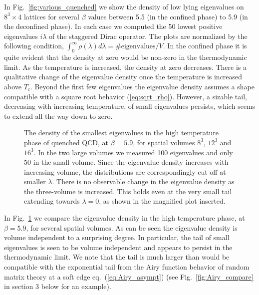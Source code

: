 \documentclass[11pt]{article}
\newcommand{\noi}{\vspace{12pt}\noindent}
\begin{document}
\noi 
In Fig.~\ref{fig:various_quenched} we show the density of low
lying eigenvalues on $8^3 \times 4$ lattices for several $\beta$
values between 5.5 (in the confined phase) to 5.9 (in the deconfined
phase).  In each case we computed the 50 lowest positive eigenvalues
$i\lambda$ of the staggered Dirac operator. The plots are normalized
by the following condition, $\int_0^{\infty}\rho(\lambda)d\lambda=\textrm{\#eigenvalues}/V$.
In the confined phase it is quite evident that the density at zero
would be non-zero in the thermodynamic limit. As the temperature is
increased, the density at zero decreases.
There is a qualitative change of the eigenvalue density once the
temperature is increased above $T_c$. Beyond the first few eigenvalues
the eigenvalue density assumes a shape compatible with a square root
behavior (\ref{eq:sqrt_rho}). However, a sizable tail, decreasing with
increasing temperature, of small eigenvalues persists, which seems to
extend all the way down to zero.

\begin{figure}
\begin{center}
\textwidth
{}
\end{center}
\vspace*{-2mm}
\caption{The density of the smallest eigenvalues in the high
temperature phase of quenched QCD, at $\beta=5.9$,
for spatial volumes $8^3$, $12^3$
and $16^3$. In the two large volumes we measured 100 eigenvalues and
only 50 in the small volume.  Since the eigenvalue density increases
with increasing volume, the distributions are correspondingly cut off
at smaller $\lambda$. There is no observable change in the eigenvalue
density as the three-volume is increased. This holds even at the very
small tail extending towards $\lambda=0$, as shown in the magnified
plot inserted.}
\label{fig:q_vol_test}
\end{figure}

\noi
In Fig.~\ref{fig:q_vol_test} we compare the eigenvalue density in the
high temperature phase, at $\beta=5.9$, for several spatial volumes.
As can be seen the eigenvalue density is volume independent to a
surprising degree. In particular, the tail of small eigenvalues is
seen to be volume independent and appears to persist in the thermodynamic
limit. We note that the tail is much larger than would be compatible with
the exponential tail from the Airy function behavior of random matrix
theory at a soft edge eq.~(\ref{eq:Airy_asympt}) (see
Fig.~\ref{fig:Airy_compare} in section 3 below for an example).
\end{document}

